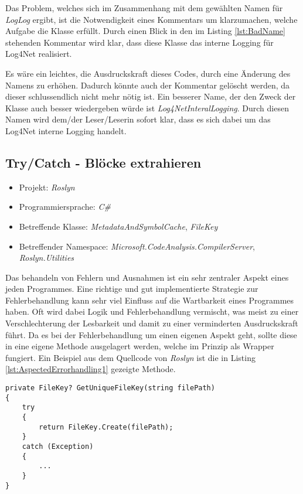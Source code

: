 \SuperPar Das Problem, welches sich im Zusammenhang mit dem gewählten Namen für \textit{LogLog} ergibt, ist die Notwendigkeit eines Kommentars um klarzumachen, welche  Aufgabe die Klasse erfüllt. Durch einen Blick in den im Listing \ref{lst:BadName} stehenden Kommentar wird klar, dass diese Klasse das interne Logging für Log4Net realisiert. 

Es wäre ein leichtes, die Ausdruckskraft dieses Codes, durch eine Änderung des Namens zu erhöhen. Dadurch könnte auch der Kommentar gelöscht werden, da dieser schlussendlich nicht mehr nötig ist. Ein besserer Name, der den Zweck der Klasse auch besser wiedergeben würde ist \textit{Log4NetInteralLogging}. Durch diesen Namen wird dem/der Leser/Leserin sofort klar, dass es sich dabei um das Log4Net interne Logging handelt.

\subsection{Try/Catch - Blöcke extrahieren}
\begin{itemize}
	\item Projekt: \textit{Roslyn}
	\item Programmiersprache: \textit{C\#}
	\item Betreffende Klasse: \textit{MetadataAndSymbolCache}, \textit{FileKey}
	\item Betreffender Namespace: \textit{Microsoft.CodeAnalysis.CompilerServer}, \textit{Roslyn.Utilities}
\end{itemize}

\SuperPar Das behandeln von Fehlern und Ausnahmen ist ein sehr zentraler Aspekt eines jeden Programmes. Eine richtige und gut implementierte Strategie zur Fehlerbehandlung kann sehr viel Einfluss auf die Wartbarkeit eines Programmes haben. Oft wird dabei Logik und Fehlerbehandlung vermischt, was meist zu einer Verschlechterung der Lesbarkeit und damit zu einer verminderten Ausdruckskraft führt. Da es bei der Fehlerbehandlung um einen eigenen Aspekt geht, sollte diese in eine eigene Methode ausgelagert werden, welche im Prinzip als Wrapper fungiert. Ein Beispiel aus dem Quellcode von \textit{Roslyn} ist die in Listing \ref{lst:AspectedErrorhandling1} gezeigte Methode.

\begin{lstlisting}[language={[Sharp]C}, caption=Beispiel für getrennten Aspekt der Fehlerbehandlung, label=lst:AspectedErrorhandling1]
private FileKey? GetUniqueFileKey(string filePath)
{
	try
	{
		return FileKey.Create(filePath);
	}
	catch (Exception)
	{
		...
	}
}
\end{lstlisting}

